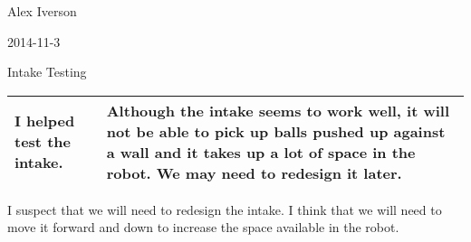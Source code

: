 Alex Iverson

2014-11-3

Intake Testing

\begin{tabular}{|p{5cm}|p{5cm}|}
 \hline
 I helped test the intake.&
 Although the intake seems to work well, it will not be able to pick up balls pushed up against a wall and it takes up a lot of space in the robot. We may need to redesign it later.
 \\
 \hline
\end{tabular}

I suspect that we will need to redesign the intake. I think that we will need to move it forward and down to increase the space available in the robot.